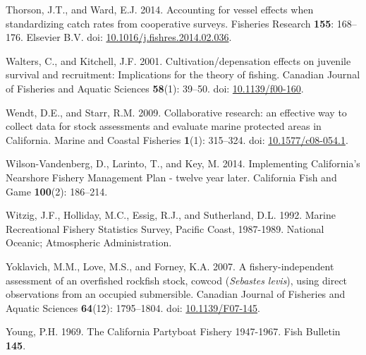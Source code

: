 \documentclass[
  english,
  a4paper,
]{article}
\newlength{\cslhangindent}
\newlength{\cslentryspacingunit} %
\newenvironment{CSLReferences}[2] %
 {%
  \setlength{\parindent}{0pt}
  \ifodd #1
  \let\oldpar\par
  \def\par{\hangindent=\cslhangindent\oldpar}
  \fi
  \setlength{\parskip}{#2\cslentryspacingunit}
 }%
 {}
\begin{document}
\begin{CSLReferences}{1}{0}
\leavevmode{}%
Thorson, J.T., and Ward, E.J. 2014. {Accounting for vessel effects when standardizing catch rates from cooperative surveys}. Fisheries Research \textbf{155}: 168--176. Elsevier B.V. doi: \href{https://doi.org/10.1016/j.fishres.2014.02.036}{10.1016/j.fishres.2014.02.036}.

\leavevmode{}%
Walters, C., and Kitchell, J.F. 2001. {Cultivation/depensation effects on juvenile survival and recruitment: Implications for the theory of fishing}. Canadian Journal of Fisheries and Aquatic Sciences \textbf{58}(1): 39--50. doi: \href{https://doi.org/10.1139/f00-160}{10.1139/f00-160}.

\leavevmode{}%
Wendt, D.E., and Starr, R.M. 2009. {Collaborative research: an effective way to collect data for stock assessments and evaluate marine protected areas in California}. Marine and Coastal Fisheries \textbf{1}(1): 315--324. doi: \href{https://doi.org/10.1577/c08-054.1}{10.1577/c08-054.1}.

\leavevmode{}%
Wilson-Vandenberg, D., Larinto, T., and Key, M. 2014. {Implementing California's Nearshore Fishery Management Plan - twelve year later}. California Fish and Game \textbf{100}(2): 186--214.

\leavevmode{}%
Witzig, J.F., Holliday, M.C., Essig, R.J., and Sutherland, D.L. 1992. {Marine Recreational Fishery Statistics Survey, Pacific Coast, 1987-1989}. National Oceanic; Atmospheric Administration.

\leavevmode{}%
Yoklavich, M.M., Love, M.S., and Forney, K.A. 2007. {A fishery-independent assessment of an overfished rockfish stock, cowcod (\emph{Sebastes levis}), using direct observations from an occupied submersible}. Canadian Journal of Fisheries and Aquatic Sciences \textbf{64}(12): 1795--1804. doi: \href{https://doi.org/10.1139/F07-145}{10.1139/F07-145}.

\leavevmode{}%
Young, P.H. 1969. {The California Partyboat Fishery 1947-1967}. Fish Bulletin \textbf{145}.

\end{CSLReferences}
\end{document}

